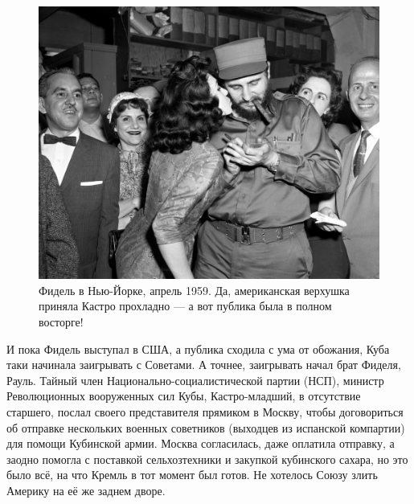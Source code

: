 \begin{figure}[h!tb] 
	\centering\includegraphics[scale=0.4]{KubaUSSR/9fJrgUUsNtI.jpg}
	\caption{Фидель в Нью-Йорке, апрель 1959. Да, американская верхушка приняла Кастро прохладно — а вот публика была в полном восторге! }%
\end{figure}

И пока Фидель выступал в США, а публика сходила с ума от обожания, Куба таки начинала заигрывать с Советами. А точнее, заигрывать начал брат Фиделя, Рауль. Тайный член Национально-социалистической партии (НСП), министр Революционных вооруженных сил Кубы, Кастро-младший, в отсутствие старшего, послал своего представителя прямиком в Москву, чтобы договориться об отправке нескольких военных советников (выходцев из испанской компартии) для помощи Кубинской армии. Москва согласилась, даже оплатила отправку, а заодно помогла с поставкой сельхозтехники и закупкой кубинского сахара, но это было всё, на что Кремль в тот момент был готов. Не хотелось Союзу злить Америку на её же заднем дворе.

